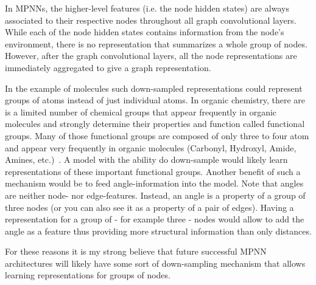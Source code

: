 In MPNNs, the higher-level features (i.e. the node hidden states) are always associated to their respective nodes throughout all graph convolutional layers. While each of the node hidden states contains information from the node's environment, there is no representation that summarizes a whole group of nodes. However, after the graph convolutional layers, all the node representations are immediately aggregated to give a graph representation.

In the example of molecules such down-sampled representations could represent groups of atoms instead of just individual atoms. In organic chemistry, there are is a limited number of chemical groups that appear frequently in organic molecules and strongly determine their properties and function called functional groups. Many of those functional groups are composed of only three to four atom and appear very frequently in organic molecules (Carbonyl, Hydroxyl, Amide, Amines, etc.)~\cite{Organic-chemistry}. A model with the ability do down-sample would likely learn representations of these important functional groups. Another benefit of such a mechanism would be to feed angle-information into the model. Note that angles are neither node- nor edge-features. Instead, an angle is a property of a group of three nodes (or you can also see it as a property of a pair of edges). Having a representation for a group of - for example three - nodes would allow to add the angle as a feature thus providing more structural information than only distances.

For these reasons it is my strong believe that future successful MPNN architectures will likely have some sort of down-sampling mechanism that allows learning representations for groups of nodes.



